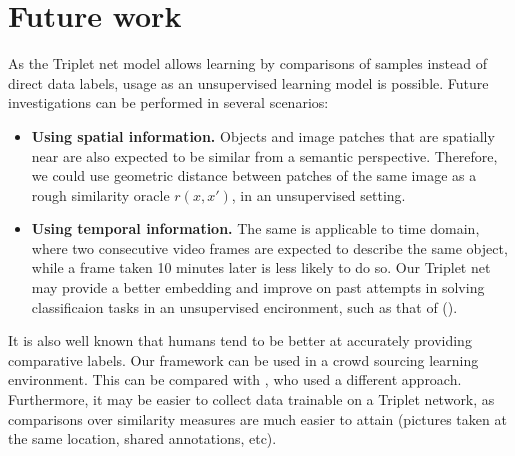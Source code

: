 \documentclass{article} %
\begin{document}
\section{Future work}
As the Triplet net model allows learning by comparisons of samples instead of direct data labels, usage as an unsupervised learning model is possible.
Future investigations can be performed in several scenarios:
\begin{itemize}
 \item {\bf Using spatial information. }Objects and image patches that are spatially near are also expected to be similar from a semantic perspective. Therefore, we could use geometric distance between patches of the same image as a rough similarity oracle $r(x,x')$, in an unsupervised setting.  
\item {\bf Using temporal information.} The same is applicable to time domain, where two consecutive video frames are expected to describe the same object, while a frame taken 10 minutes later is less likely to do so.
Our Triplet net may provide a better embedding and improve on past attempts in solving classificaion
tasks in an unsupervised encironment, such as that of (\citet{mobahi2009deep}).
\end{itemize}
It is also well known that humans tend to be better at accurately providing comparative labels. Our framework can be used in a crowd sourcing learning environment. This can be compared with \citet{shamir}, who used a different approach.
Furthermore, it may be easier to collect data trainable on a Triplet network, as comparisons over similarity measures are much easier to attain (pictures taken at the same location, shared annotations, etc).
\end{document}
